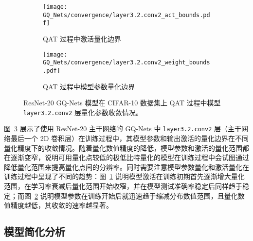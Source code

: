 \begin{figure}[htb]
  \centering
  \begin{subfigure}[t]{0.45\columnwidth}
    \centering
    \texttt{[image: GQ\_Nets/convergence/layer3.2.conv2\_act\_bounds.pdf]}
    \caption{QAT 过程中激活量化边界}
    \label{img::gq_nets::act_bounds}
  \end{subfigure}
  \quad
  \begin{subfigure}[t]{0.45\columnwidth}
    \centering
    \texttt{[image: GQ\_Nets/convergence/layer3.2.conv2\_weight\_bounds.pdf]}
    \caption{QAT 过程中模型参数量化边界}
    \label{img::gq_nets::weight_bounds}
  \end{subfigure}
  \caption{ResNet-20 GQ-Nets 模型在 CIFAR-10 数据集上 QAT 过程中模型 \texttt{layer3.2.conv2} 层量化参数收敛情况。}
  \label{img::gq_nets::res20_quant_bounds}
\end{figure}

图~\ref{img::gq_nets::res20_quant_bounds} 展示了使用 ResNet-20 主干网络的 GQ-Nets 中 \verb|layer3.2.conv2| 层（主干网络最后一个 2D 卷积层）在训练过程中，其模型参数和输出激活的量化边界在不同量化精度下的收敛情况。随着量化数值精度的降低，模型参数和激活的量化范围都在逐渐变窄，说明可用量化点较低的极低比特量化的模型在训练过程中会试图通过降低量化范围来提高量化点间的分辨率。同时需要注意模型参数量化和激活量化在训练过程中呈现了不同的趋势：图~\ref{img::gq_nets::act_bounds} 说明模型激活在训练初期首先逐渐增大量化范围，在学习率衰减后量化范围开始收窄，并在模型测试准确率稳定后同样趋于稳定；而图~\ref{img::gq_nets::weight_bounds} 说明模型参数在训练开始后就迅速趋于缩减分布数值范围，且量化数值精度越低，其收敛的速率越显著。
\subsection{模型简化分析}


